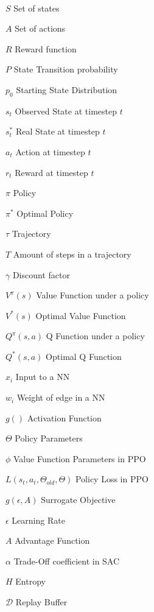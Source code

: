 \documentclass[bachelor,english]{infothesis}
\begin{document}
\begin{description}
	\\
	\item $S$ \dotfill Set of states
	\item $A$ \dotfill Set of actions
	\item $R$ \dotfill Reward function
	\item $P$ \dotfill State Transition probability
	\item $p_0$ \dotfill Starting State Distribution
	\item $s_t$ \dotfill Observed State at timestep $t$
	\item $s_t^*$ \dotfill Real State at timestep $t$
	\item $a_t$ \dotfill Action at timestep $t$
	\item $r_t$ \dotfill Reward at timestep $t$
	\item $\pi$ \dotfill Policy
	\item $\pi^*$ \dotfill Optimal Policy
	\item $\tau$ \dotfill Trajectory
	\item $T$ \dotfill Amount of steps in a trajectory
	\item $\gamma$ \dotfill Discount factor
	\item $V^{\pi}(s)$ \dotfill Value Function under a policy
	\item $V^*(s)$ \dotfill Optimal Value Function
	\item $Q^{\pi} (s,a)$ \dotfill Q Function under a policy
	\item $Q^*(s,a)$ \dotfill Optimal Q Function
	\item $x_i$ \dotfill Input to a NN
	\item $w_i$ \dotfill Weight of edge in a NN
	\item $g()$ \dotfill Activation Function
	\item $\Theta$ \dotfill Policy Parameters
	\item $\phi$ \dotfill Value Function Parameters in PPO
	\item $L(s_t, a_t, \Theta_{old}, \Theta)$ \dotfill Policy Loss in PPO
	\item $g(\epsilon, A)$ \dotfill Surrogate Objective
	\item $\epsilon$ \dotfill Learning Rate
	\item $A$ \dotfill Advantage Function
	\item $\alpha$ \dotfill Trade-Off coefficient in SAC
	\item $H$ \dotfill Entropy
	\item $\mathcal{D}$ \dotfill Replay Buffer

\end{description}
\end{document}

